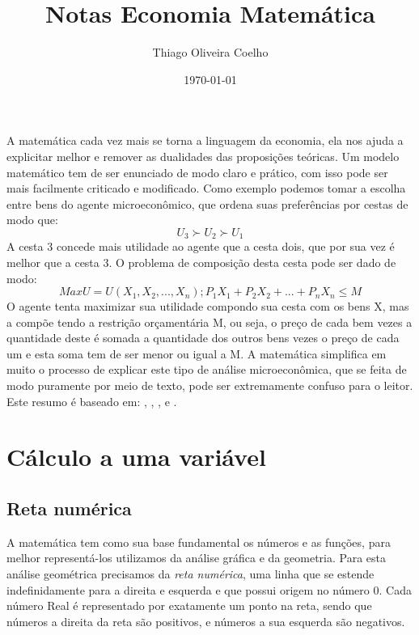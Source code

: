 \documentclass[12pt,a4paper,oneside,brazil]{abntex2}
\title{Notas Economia Matemática}
\author{Thiago Oliveira Coelho}
\date{\today}
\begin{document}
\pagestyle{plain}

\maketitle

A matemática cada vez mais se torna a linguagem da economia, ela nos ajuda a explicitar melhor e remover as dualidades das proposições teóricas. Um modelo matemático tem de ser enunciado de modo claro e prático, com isso pode ser mais facilmente criticado e modificado. Como exemplo podemos tomar a escolha entre bens do agente microeconômico, que ordena suas preferências por cestas de modo que:
\[ U_3 \succ U_2 \succ U_1 \]
A cesta 3 concede mais utilidade ao agente que a cesta dois, que por sua vez é melhor que a cesta 3. O problema de composição desta cesta pode ser dado de modo:
\[ Max U = U( X_1, X_2, ..., X_n); P_1 X_1 + P_2 X_2 + ... + P_n X_n \leq M \]
O agente tenta maximizar sua utilidade compondo sua cesta com os bens X, mas a compõe tendo a restrição orçamentária M, ou seja, o preço de cada bem vezes a quantidade deste é somada a quantidade dos outros bens vezes o preço de cada um e esta soma tem de ser menor ou igual a M. A matemática simplifica em muito o processo de explicar este tipo de análise microeconômica, que se feita de modo puramente por meio de texto, pode ser extremamente confuso para o leitor. \newline
Este resumo é baseado em: \cite{chiang1984}, \cite{simon}, \cite{nicholson}, \cite{boldrini} e \cite{stewart}.
\clearpage

\tableofcontents

\chapter{Cálculo a uma variável}

\section{Reta numérica}
A matemática tem como sua base fundamental os números e as funções, para melhor representá-los utilizamos da análise gráfica e da geometria. Para esta análise geométrica precisamos da \emph{reta numérica}, uma linha que se estende indefinidamente para a direita e esquerda e que possui origem no número 0. Cada número Real é representado por exatamente um ponto na reta, sendo que números a direita da reta são positivos, e números a sua esquerda são negativos.
\end{document}

